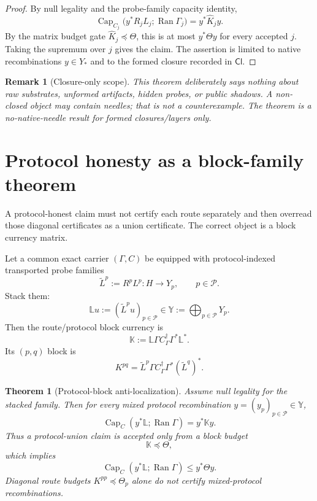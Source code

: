 \documentclass[11pt]{article}
\newtheorem{theorem}{Theorem}
\newtheorem{remark}{Remark}
\newcommand{\Ran}{\operatorname{Ran}}
\providecommand{\Cap}{\operatorname{Cap}}
\newcommand{\Loewner}{\preceq}
\begin{document}
\begin{proof}
By null legality and the probe-family capacity identity,
\[
  \Cap_{C_j}\bigl(y^*R_jL_j;\Ran\Gamma_j\bigr)
  = y^*\widehat K_jy.
\]
By the matrix budget gate $\widehat K_j\Loewner\Theta$, this is at most $y^*\Theta y$ for every accepted $j$.  Taking the supremum over $j$ gives the claim.  The assertion is limited to native recombinations $y\in Y_*$ and to the formed closure recorded in $\mathsf{Cl}$.
\end{proof}

\begin{remark}[Closure-only scope]
This theorem deliberately says nothing about raw substrates, unformed artifacts, hidden probes, or public shadows.  A non-closed object may contain needles; that is not a counterexample.  The theorem is a no-native-needle result for formed closures/layers only.
\end{remark}

\section{Protocol honesty as a block-family theorem}

A protocol-honest claim must not certify each route separately and then overread those diagonal certificates as a union certificate.  The correct object is a block currency matrix.

Let a common exact carrier $(\Gamma,C)$ be equipped with protocol-indexed transported probe families
\[
  \widetilde L^p:=R^pL^p:H\to Y_p,
  \qquad p\in\mathcal P.
\]
Stack them:
\[
  \mathbb L u := (\widetilde L^p u)_{p\in\mathcal P}
  \in
  \mathbb Y:=\bigoplus_{p\in\mathcal P}Y_p.
\]
Then the route/protocol block currency is
\[
  \mathbb K
  :=
  \mathbb L\Gamma C_\Gamma^\dagger\Gamma^*\mathbb L^*.
\]
Its $(p,q)$ block is
\[
  K^{pq}=\widetilde L^p\Gamma C_\Gamma^\dagger\Gamma^*(\widetilde L^q)^*.
\]

\begin{theorem}[Protocol-block anti-localization]
Assume null legality for the stacked family.  Then for every mixed protocol recombination $y=(y_p)_{p\in\mathcal P}\in\mathbb Y$,
\[
  \Cap_C(y^*\mathbb L;\Ran\Gamma)
  =y^*\mathbb K y.
\]
Thus a protocol-union claim is accepted only from a block budget
\[
  \mathbb K\Loewner\mathbb\Theta,
\]
which implies
\[
  \Cap_C(y^*\mathbb L;\Ran\Gamma)
  \le y^*\mathbb\Theta y.
\]
Diagonal route budgets $K^{pp}\Loewner\Theta_p$ alone do not certify mixed-protocol recombinations.
\end{theorem}
\end{document}
